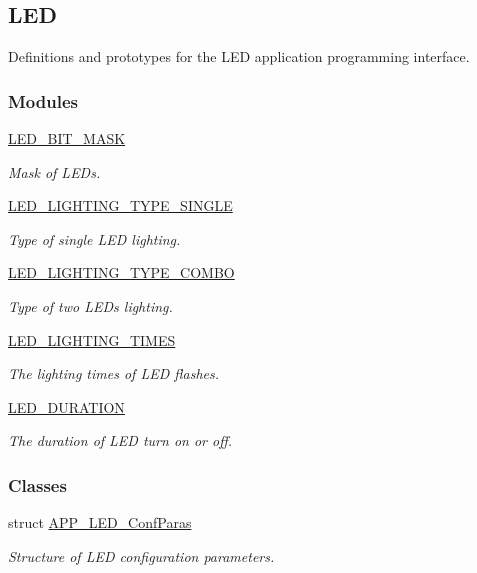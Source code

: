 \hypertarget{group___l_e_d}{}\subsection{L\+ED}
\label{group___l_e_d}


Definitions and prototypes for the L\+ED application programming interface.  


\subsubsection*{Modules}
\begin{DoxyCompactItemize}
\item 
\hyperlink{group___l_e_d___b_i_t___m_a_s_k}{L\+E\+D\+\_\+\+B\+I\+T\+\_\+\+M\+A\+SK}
\begin{DoxyCompactList}\small\item\em Mask of L\+E\+Ds. \end{DoxyCompactList}\item 
\hyperlink{group___l_e_d___l_i_g_h_t_i_n_g___t_y_p_e___s_i_n_g_l_e}{L\+E\+D\+\_\+\+L\+I\+G\+H\+T\+I\+N\+G\+\_\+\+T\+Y\+P\+E\+\_\+\+S\+I\+N\+G\+LE}
\begin{DoxyCompactList}\small\item\em Type of single L\+ED lighting. \end{DoxyCompactList}\item 
\hyperlink{group___l_e_d___l_i_g_h_t_i_n_g___t_y_p_e___c_o_m_b_o}{L\+E\+D\+\_\+\+L\+I\+G\+H\+T\+I\+N\+G\+\_\+\+T\+Y\+P\+E\+\_\+\+C\+O\+M\+BO}
\begin{DoxyCompactList}\small\item\em Type of two L\+E\+Ds lighting. \end{DoxyCompactList}\item 
\hyperlink{group___l_e_d___l_i_g_h_t_i_n_g___t_i_m_e_s}{L\+E\+D\+\_\+\+L\+I\+G\+H\+T\+I\+N\+G\+\_\+\+T\+I\+M\+ES}
\begin{DoxyCompactList}\small\item\em The lighting times of L\+ED flashes. \end{DoxyCompactList}\item 
\hyperlink{group___l_e_d___d_u_r_a_t_i_o_n}{L\+E\+D\+\_\+\+D\+U\+R\+A\+T\+I\+ON}
\begin{DoxyCompactList}\small\item\em The duration of L\+ED turn on or off. \end{DoxyCompactList}\end{DoxyCompactItemize}
\subsubsection*{Classes}
\begin{DoxyCompactItemize}
\item 
struct \hyperlink{struct_a_p_p___l_e_d___conf_paras}{A\+P\+P\+\_\+\+L\+E\+D\+\_\+\+Conf\+Paras}
\begin{DoxyCompactList}\small\item\em Structure of L\+ED configuration parameters. \end{DoxyCompactList}\end{DoxyCompactItemize}
